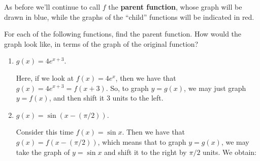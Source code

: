 \documentclass{ximera}
\begin{document}
As before we'll continue to call $f$ the {\bf parent function}, whose graph will be drawn in blue, while the graphs of the ``child'' functions will be indicated in red.

\begin{example}
  For each of the following functions, find the parent function. How would the graph look like, in terms of the graph of the original function?
  \begin{enumerate}[label=\alph*.]
  \item $g(x) = 4e^{x+3}$. \\[.5em]
    \begin{explanation}
      Here, if we look at $f(x) = 4e^x$, then we have that $g(x) = 4e^{x+3} = f(x+3)$. So, to graph $y=g(x)$, we may just graph $y = f(x)$, and then shift it $3$ units to the left.
      \begin{image}
      \end{image}
    \end{explanation}
  \item $g(x) = \sin(x - (\pi/2))$. \\[.5em]
    \begin{explanation}
      Consider this time $f(x) = \sin x$. Then we have that $g(x) = f(x-(\pi/2))$, which means that to graph $y=g(x)$, we may take the graph of $y=\sin x$ and shift it to the right by $\pi/2$ units. We obtain:
            \begin{image}

\end{image}
\end{explanation}
\end{enumerate}
\end{example}
\end{document}
